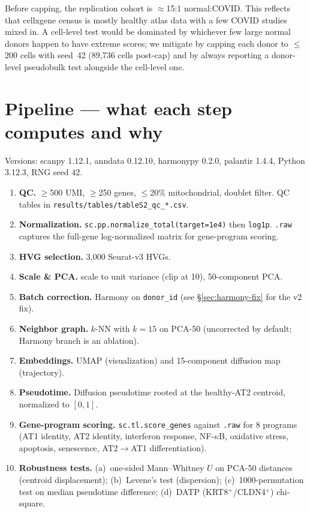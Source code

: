 \documentclass[11pt]{article}
\begin{document}
Before capping, the replication cohort is $\approx$15:1 normal:COVID. This reflects
that cellxgene census is mostly healthy atlas data with a few COVID studies mixed in.
A cell-level test would be dominated by whichever few large normal donors happen to
have extreme scores; we mitigate by capping each donor to $\leq$200 cells with seed~42
(89{,}736 cells post-cap) and by always reporting a donor-level pseudobulk test
alongside the cell-level one.

\section{Pipeline --- what each step computes and why}

Versions: scanpy 1.12.1, anndata 0.12.10, harmonypy 0.2.0, palantir 1.4.4,
Python 3.12.3, RNG seed 42.

\begin{enumerate}
\item \textbf{QC.} $\geq$500 UMI, $\geq$250 genes, $\leq$20\% mitochondrial, doublet
      filter. QC tables in \texttt{results/tables/tableS2\_qc\_*.csv}.
\item \textbf{Normalization.} \texttt{sc.pp.normalize\_total(target=1e4)} then
      \texttt{log1p}. \texttt{.raw} captures the full-gene log-normalized matrix for
      gene-program scoring.
\item \textbf{HVG selection.} 3{,}000 Seurat-v3 HVGs.
\item \textbf{Scale \& PCA.} scale to unit variance (clip at 10), 50-component PCA.
\item \textbf{Batch correction.} Harmony on \texttt{donor\_id}
      (see \S\ref{sec:harmony-fix} for the v2 fix).
\item \textbf{Neighbor graph.} $k$-NN with $k{=}15$ on PCA-50 (uncorrected by default;
      Harmony branch is an ablation).
\item \textbf{Embeddings.} UMAP (visualization) and 15-component diffusion map
      (trajectory).
\item \textbf{Pseudotime.} Diffusion pseudotime rooted at the healthy-AT2 centroid,
      normalized to $[0,1]$.
\item \textbf{Gene-program scoring.} \texttt{sc.tl.score\_genes} against \texttt{.raw}
      for 8 programs (AT1 identity, AT2 identity, interferon response, NF-$\kappa$B,
      oxidative stress, apoptosis, senescence, AT2$\to$AT1 differentiation).
\item \textbf{Robustness tests.}
      (a)~one-sided Mann--Whitney $U$ on PCA-50 distances (centroid displacement);
      (b)~Levene's test (dispersion);
      (c)~1000-permutation test on median pseudotime difference;
      (d)~DATP (KRT8$^+$/CLDN4$^+$) chi-square.
\end{enumerate}
\end{document}
